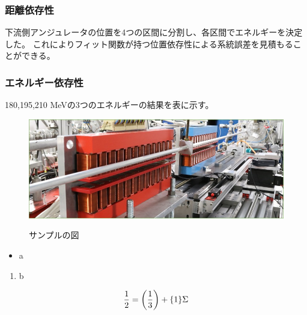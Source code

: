 \documentclass[a4paper,11pt,uplatex]{jsbook}
\begin{document}
\subsubsection{距離依存性}
下流側アンジュレータの位置を4つの区間に分割し、各区間でエネルギーを決定した。
これによりフィット関数が持つ位置依存性による系統誤差を見積もることができる。

\subsubsection{エネルギー依存性}
180,195,210 MeVの3つのエネルギーの結果を表に示す。













\clearpage

\begin{figure}[tb]
  \centering
  \includegraphics[width=0.8\linewidth]{image/1-1.jpg}\\
  \caption{サンプルの図}
  \label{sample_image}
\end{figure}

\begin{itemize}
  \item a
\end{itemize}
\begin{enumerate}
  \item b
\end{enumerate}

\begin{align}
\frac{1}{2} = \qty(\frac{1}{3}) + \qty{1}\Sigma
\end{align}
\end{document}
